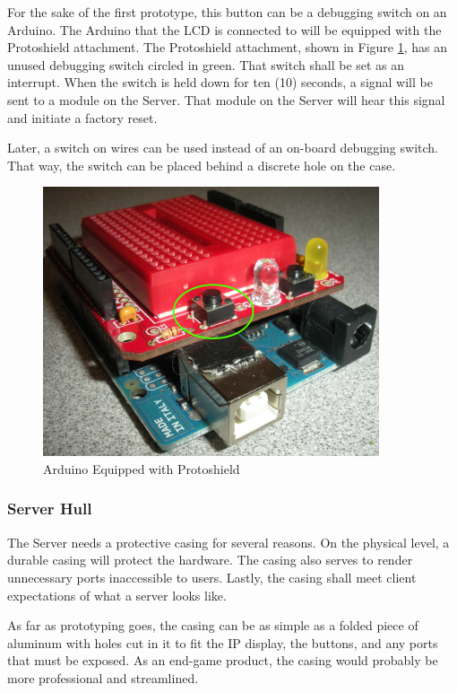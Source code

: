 For the sake of the first prototype, this button can be a debugging switch on an Arduino. 
The Arduino that the \ac{LCD} is connected to will be equipped with the Protoshield attachment. 
The Protoshield attachment, shown in Figure \ref{Protoshield}, has an unused debugging switch circled in green. 
That switch shall be set as an interrupt. 
When the switch is held down for ten (10) seconds, a signal will be sent to a module on the Server. 
That module on the Server will hear this signal and initiate a factory reset. 

Later, a switch on wires can be used instead of an on-board debugging switch. 
That way, the switch can be placed behind a discrete hole on the case.


\begin{figure}
\centering
\includegraphics[scale=0.6]{Hardware/images/ProtoShield.png}
\caption{Arduino Equipped with Protoshield}
\label{Protoshield}
\end{figure}
	
\subsubsection{Server Hull}
The Server needs a protective casing for several reasons. 
On the physical level, a durable casing will protect the hardware. 
The casing also serves to render unnecessary ports inaccessible to users. 
Lastly, the casing shall meet client expectations of what a server looks like.

As far as prototyping goes, the casing can be as simple as a folded piece of aluminum
with holes cut in it to fit the \ac{IP} display, the buttons, and any ports that must be
exposed. As an end-game product, the casing would probably be more professional and streamlined.
